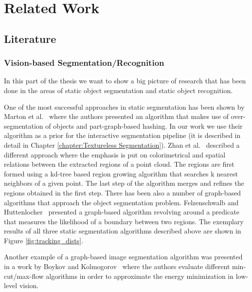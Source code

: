 \chapter{Related Work}
\label{chapter:Related Work}


\section{Literature}
\subsection{Vision-based Segmentation/Recognition}




In this part of the thesis we want to show a big picture of research that has been done in the areas of static object segmentation and static object recognition. 

One of the most successful approaches in static segmentation has been shown by Marton et al.~\cite{marton12SC} where the authors presented an algorithm that makes use of over-segmentation of objects and part-graph-based hashing. In our work we use their algorithm as a prior for the interactive segmentation pipeline (it is described in detail in Chapter \ref{chapter:Textureless Segmentation}). Zhan et al.~\cite{RGBRegionGrowing} described a different approach where the emphasis is put on colorimetrical and spatial relations between the extracted regions of a point cloud. The regions are first formed using a kd-tree based region growing algorithm that searches k nearest neighbors of a given point. The last step of the algorithm merges and refines the regions obtained in the first step. There has been also a number of graph-based algorithms that approach the object segmentation problem. Felzenschwalb and Huttenlocher~\cite{Felzenszwalb} presented a graph-based algorithm revolving around a predicate that measures the likelihood of a boundary between two regions.
The exemplary results of all three static segmentation algorithms described above are shown in Figure \ref{fig:tracking_dists}.  

Another example of a graph-based image segmentation algorithm was presented in a work by Boykov and Kolmogorov~\cite{BoykovGraphCut} where the authors evaluate different min-cut/max-flow algorithms in order to approximate the energy minimization in low-level vision. 

